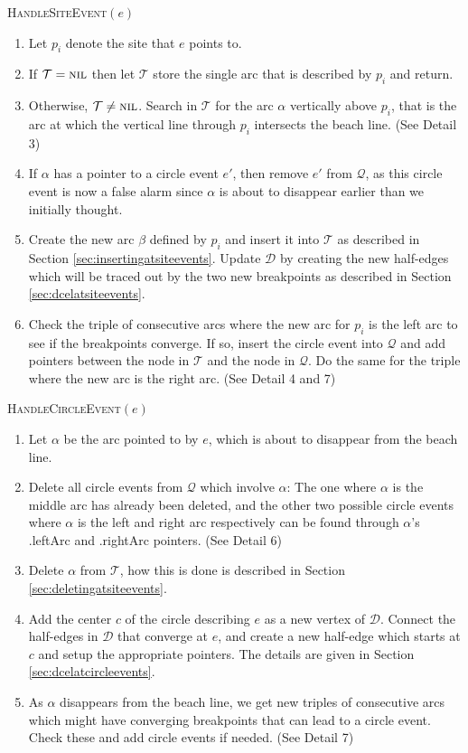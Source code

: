 \begin{proc} \textsc{HandleSiteEvent}$(e)$
\begin{enumerate}
    \item Let $p_i$ denote the site that $e$ points to.
    \item If $\mathcal{T} = \textsc{nil}$ then let $\mathcal{T}$ store the single arc that is described by $p_i$ and return.
    \item Otherwise, $\mathcal{T} \ne \textsc{nil}$. Search in $\mathcal{T}$ for the arc $\alpha$ vertically above $p_i$, that is the arc at which the vertical line through $p_i$ intersects the beach line. (See Detail 3)
    \item If $\alpha$ has a pointer to a circle event $e'$, then remove $e'$ from $\mathcal{Q}$, as this circle event is now a false alarm since $\alpha$ is about to disappear earlier than we initially thought.
    \item Create the new arc $\beta$ defined by $p_i$ and insert it into $\mathcal{T}$ as described in Section \ref{sec:insertingatsiteevents}. Update $\mathcal{D}$ by creating the new half-edges which will be traced out by the two new breakpoints as described in Section \ref{sec:dcelatsiteevents}.
    \item Check the triple of consecutive arcs where the new arc for $p_i$ is the left arc to see if the breakpoints converge. If so, insert the circle event into $\mathcal{Q}$ and add pointers between the node in $\mathcal{T}$ and the node in $\mathcal{Q}$. Do the same for the triple where the new arc is the right arc. (See Detail 4 and 7)
\end{enumerate}
\end{proc}

\begin{proc} \textsc{HandleCircleEvent}$(e)$
\begin{enumerate}
    \item Let $\alpha$ be the arc pointed to by $e$, which is about to disappear from the beach line.
    \item Delete all circle events from $\mathcal{Q}$ which involve $\alpha$: The one where $\alpha$ is the middle arc has already been deleted, and the other two possible circle events where $\alpha$ is the left and right arc respectively can be found through $\alpha$'s \textsf{.leftArc} and \textsf{.rightArc} pointers. (See Detail 6)
    \item Delete $\alpha$ from $\mathcal{T}$, how this is done is described in Section \ref{sec:deletingatsiteevents}.
    \item Add the center $c$ of the circle describing $e$ as a new vertex of $\mathcal{D}$. Connect the half-edges in $\mathcal{D}$ that converge at $e$, and create a new half-edge which starts at $c$ and setup the appropriate pointers. The details are given in Section \ref{sec:dcelatcircleevents}.
    \item As $\alpha$ disappears from the beach line, we get new triples of consecutive arcs which might have converging breakpoints that can lead to a circle event. Check these and add circle events if needed. (See Detail 7)
\end{enumerate}
\end{proc}


